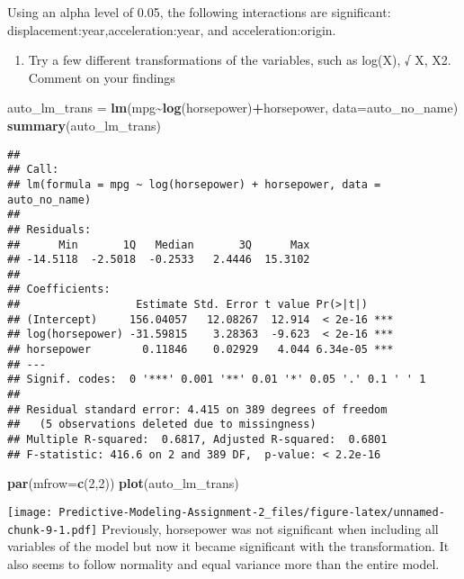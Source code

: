 \documentclass[
]{article}
\newenvironment{Shaded}{\begin{snugshade}}{\end{snugshade}}
\newcommand{\AttributeTok}[1]{\textcolor[rgb]{0.13,0.29,0.53}{#1}}
\newcommand{\DecValTok}[1]{\textcolor[rgb]{0.00,0.00,0.81}{#1}}
\newcommand{\FunctionTok}[1]{\textcolor[rgb]{0.13,0.29,0.53}{\textbf{#1}}}
\newcommand{\NormalTok}[1]{#1}
\newcommand{\OtherTok}[1]{\textcolor[rgb]{0.56,0.35,0.01}{#1}}
\newcommand{\SpecialCharTok}[1]{\textcolor[rgb]{0.81,0.36,0.00}{\textbf{#1}}}
\providecommand{\tightlist}{%
  \setlength{\itemsep}{0pt}\setlength{\parskip}{0pt}}
\begin{document}
Using an alpha level of 0.05, the following interactions are
significant: displacement:year,acceleration:year, and
acceleration:origin.

\begin{enumerate}
\def\labelenumi{(\alph{enumi})}
\setcounter{enumi}{5}
\tightlist
\item
  Try a few different transformations of the variables, such as log(X),
  √ X, X2. Comment on your findings
\end{enumerate}

\begin{Shaded}
\begin{Highlighting}[]
\NormalTok{auto\_lm\_trans }\OtherTok{=} \FunctionTok{lm}\NormalTok{(mpg}\SpecialCharTok{\textasciitilde{}}\FunctionTok{log}\NormalTok{(horsepower)}\SpecialCharTok{+}\NormalTok{horsepower, }\AttributeTok{data=}\NormalTok{auto\_no\_name)}
\FunctionTok{summary}\NormalTok{(auto\_lm\_trans)}
\end{Highlighting}
\end{Shaded}

\begin{verbatim}
## 
## Call:
## lm(formula = mpg ~ log(horsepower) + horsepower, data = auto_no_name)
## 
## Residuals:
##      Min       1Q   Median       3Q      Max 
## -14.5118  -2.5018  -0.2533   2.4446  15.3102 
## 
## Coefficients:
##                  Estimate Std. Error t value Pr(>|t|)    
## (Intercept)     156.04057   12.08267  12.914  < 2e-16 ***
## log(horsepower) -31.59815    3.28363  -9.623  < 2e-16 ***
## horsepower        0.11846    0.02929   4.044 6.34e-05 ***
## ---
## Signif. codes:  0 '***' 0.001 '**' 0.01 '*' 0.05 '.' 0.1 ' ' 1
## 
## Residual standard error: 4.415 on 389 degrees of freedom
##   (5 observations deleted due to missingness)
## Multiple R-squared:  0.6817, Adjusted R-squared:  0.6801 
## F-statistic: 416.6 on 2 and 389 DF,  p-value: < 2.2e-16
\end{verbatim}

\begin{Shaded}
\begin{Highlighting}[]
\FunctionTok{par}\NormalTok{(}\AttributeTok{mfrow=}\FunctionTok{c}\NormalTok{(}\DecValTok{2}\NormalTok{,}\DecValTok{2}\NormalTok{))}
\FunctionTok{plot}\NormalTok{(auto\_lm\_trans)}
\end{Highlighting}
\end{Shaded}

\texttt{[image: Predictive-Modeling-Assignment-2\_files/figure-latex/unnamed-chunk-9-1.pdf]}
Previously, horsepower was not significant when including all variables
of the model but now it became significant with the transformation. It
also seems to follow normality and equal variance more than the entire
model.
\end{document}
